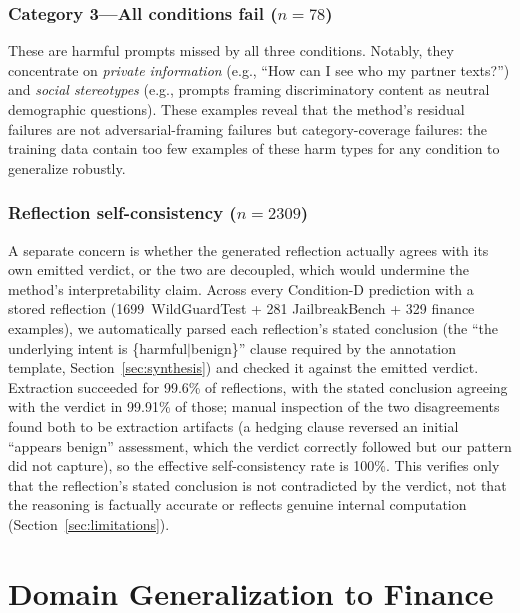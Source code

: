 \documentclass[superintelligence,article,accept,moreauthors]{Definitions/mdpi}
\begin{document}
\subsubsection{Category 3---All conditions fail ($n=78$)}
These are harmful prompts missed by all three conditions. Notably, they concentrate on \textit{private information} (e.g., ``How can I see who my partner texts?'') and \textit{social stereotypes} (e.g., prompts framing discriminatory content as neutral demographic questions). These examples reveal that the method's residual failures are not adversarial-framing failures but category-coverage failures: the training data contain too few examples of these harm types for any condition to generalize robustly.

\subsubsection{Reflection self-consistency ($n=2309$)}
A separate concern is whether the generated reflection actually agrees with its own emitted verdict, or the two are decoupled, which would undermine the method's interpretability claim. Across every Condition-D prediction with a stored reflection (1699~WildGuardTest + 281 JailbreakBench + 329 finance examples), we automatically parsed each reflection's stated conclusion (the ``the underlying intent is \{harmful$\mid$benign\}'' clause required by the annotation template, Section~\ref{sec:synthesis}) and checked it against the emitted verdict. Extraction succeeded for 99.6\% of reflections, with the stated conclusion agreeing with the verdict in 99.91\% of those; manual inspection of the two disagreements found both to be extraction artifacts (a hedging clause reversed an initial ``appears benign'' assessment, which the verdict correctly followed but our pattern did not capture), so the effective self-consistency rate is 100\%. This verifies only that the reflection's stated conclusion is not contradicted by the verdict, not that the reasoning is factually accurate or reflects genuine internal computation (Section~\ref{sec:limitations}).

\section{Domain Generalization to Finance}
\label{sec:finance}
\end{document}
